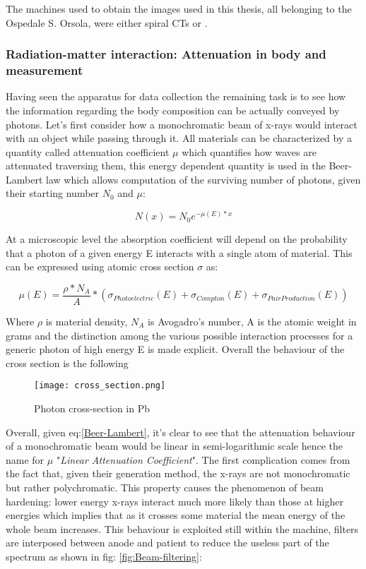The machines used to obtain the images used in this thesis, all belonging to the Ospedale S. Orsola, were either spiral CTs or .


\subsubsection{Radiation-matter interaction: Attenuation in body and measurement}
Having seen the apparatus for data collection the remaining task is to see how the information regarding the body composition can be actually conveyed by photons.
Let's first consider how a monochromatic beam of x-rays would interact with an object while passing through it. All materials can be characterized by a quantity called attenuation coefficient $\mu$ which quantifies how waves are attenuated traversing them, this energy dependent quantity is used in the Beer-Lambert law which allows computation of the surviving number of photons, given their starting number $N_0$ and $\mu$:

\begin{equation}
N(x) = N_0e^{-\mu(E)*x}
\label{Beer-Lambert}
\end{equation}

At a microscopic level the absorption coefficient will depend on the probability that a photon of a given energy E interacts with a single atom of material. This can be expressed using atomic cross section $\sigma$ as:

\begin{equation}\label{Lin_att_coef_def}
\mu(E) = \frac{\rho*N_A}{A}*(\sigma_{Photoelectric}(E)+\sigma_{Compton}(E)+\sigma_{PairProduction}(E))
\end{equation}

Where $\rho$ is material density, $N_A$ is Avogadro's number, A is the atomic weight in grams and the distinction among the various possible interaction processes for a generic photon of high energy E is made explicit. Overall the behaviour of the cross section is the following

\begin{figure}[H]
\centering
  		\texttt{[image: cross\_section.png]}
        \caption{Photon cross-section in Pb\label{fig:Photon-Cross-sect}}
\end{figure}

Overall, given eq:\ref{Beer-Lambert}, it's clear to see that the attenuation behaviour of a monochromatic beam would be linear in semi-logarithmic scale hence the name for $\mu$ "\textit{Linear Attenuation Coefficient}". The first complication comes from the fact that, given their generation method, the x-rays are not monochromatic but rather polychromatic. This property causes the phenomenon of beam hardening: lower energy x-rays interact much more likely than those at higher energies which implies that as it crosses some material the mean energy of the whole beam increases. This behaviour is exploited still within the machine, filters are interposed between anode and patient to reduce the useless part of the spectrum as shown in fig: \ref{fig:Beam-filtering}:

